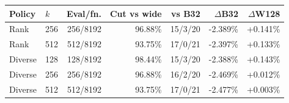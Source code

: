 \begin{tabular}{llrrrrr}
\toprule
Policy & $k$ & Eval/fn. & Cut vs wide & vs B32 & $\Delta$B32 & $\Delta$W128 \\
\midrule
Rank & 256 & 256/8192 & 96.88\% & 15/3/20 & -2.389\% & +0.141\% \\
Rank & 512 & 512/8192 & 93.75\% & 17/0/21 & -2.397\% & +0.133\% \\
Diverse & 128 & 128/8192 & 98.44\% & 15/3/20 & -2.388\% & +0.143\% \\
Diverse & 256 & 256/8192 & 96.88\% & 16/2/20 & -2.469\% & +0.012\% \\
Diverse & 512 & 512/8192 & 93.75\% & 17/0/21 & -2.477\% & +0.003\% \\
\bottomrule
\end{tabular}
